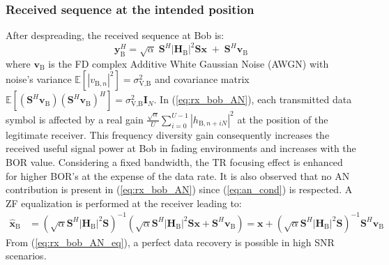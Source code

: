 \documentclass[12pt, draftclsnofoot, onecolumn]{IEEEtran}
\newcommand{\module}[1]{\left|#1\right|}
\newcommand{\EX}[1]{\mathbb{E} \left[#1\right]}%
\newcommand{\HB}{\textbf{H}_{\text{B}}}
\newcommand{\spread}{\textbf{S}}
\begin{document}
\subsubsection{Received sequence at the intended position}
After despreading, the received sequence at Bob is: 
\begin{equation}
	\textbf{y}_{\text{B}}^H = \sqrt{\alpha} \; \spread^H \module{\HB}^2 \spread \textbf{x} \;  +  \;  \spread^H \textbf{v}_\text{B} 
	\label{eq:rx_bob_AN}
\end{equation}
where $\textbf{v}_\text{B}$ is the FD complex Additive White Gaussian Noise (AWGN) with noise's variance $\EX{|v_{\text{B},n}|^2}  = \sigma_{\text{V,B}}^2$ and covariance matrix $\EX{(\spread^H  \textbf{v}_\text{B}) (\spread^H \textbf{v}_\text{B})^H} = \sigma_{\text{V,B}}^2 \textbf{I}_N$. In (\ref{eq:rx_bob_AN}), each transmitted data symbol is affected by a real gain $ \frac{\sqrt{\alpha}}{U}\sum_{i=0}^{U-1} \left| h_{\text{B}, n + iN}\right|^2$ at the position of the legitimate receiver. This frequency diversity gain consequently increases the received useful signal power at Bob in fading environments and increases with the BOR value. Considering a fixed bandwidth, the TR focusing effect is enhanced for higher BOR's at the expense of the data rate. It is also observed that no AN contribution is present in (\ref{eq:rx_bob_AN}) since (\ref{eq:an_cond}) is respected. A ZF equalization is performed at the receiver leading to:
\begin{equation}
	\begin{split}
		\hat{\textbf{x}}_{\text{B}} &= \left( \sqrt{\alpha} \spread^H \module{\HB}^2 \spread \right)^{-1}  \left(\sqrt{\alpha}  \spread^H\module{\HB}^2 \spread \textbf{x}   +    \spread^H \textbf{v}_\text{B}\right) = \textbf{x} + \left( \sqrt{\alpha} \spread^H \module{\HB}^2 \spread \right)^{-1} \spread^H \textbf{v}_\text{B}
	\end{split}
	\
	\label{eq:rx_bob_AN_eq}
\end{equation}
From (\ref{eq:rx_bob_AN_eq}), a perfect data recovery is possible in high SNR scenarios.



%
\end{document}
